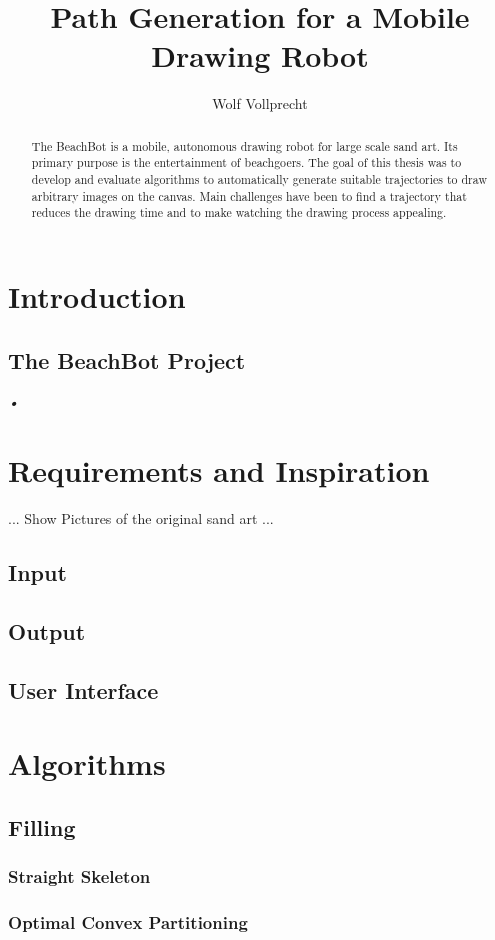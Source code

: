 \documentclass[10pt,a4paper]{article}
\author{Wolf Vollprecht}
\title{Path Generation for a Mobile Drawing Robot}
\begin{document}
\begin{abstract}
The BeachBot is a mobile, autonomous drawing robot for large scale sand art. Its primary purpose is the entertainment of beachgoers. The goal of this thesis was to develop and evaluate algorithms to automatically generate suitable trajectories to draw arbitrary images on the canvas. Main challenges have been to find a trajectory that reduces the drawing time and to make watching the drawing process appealing.
\end{abstract}

\section{Introduction}
\subsection{The BeachBot Project}
\textsl{•}
\section{Requirements and Inspiration}

... Show Pictures of the original sand art ... 

\subsection{Input}
\subsection{Output}
\subsection{User Interface}

\section{Algorithms}

\subsection{Filling}
\subsubsection{Straight Skeleton}

\subsubsection{Optimal Convex Partitioning}
\end{document}
